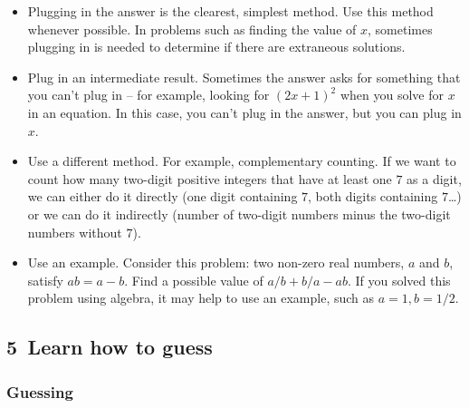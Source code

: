 \documentclass[10pt,paper=letter]{scrartcl}
\begin{document}
\begin{itemize}

\item Plugging in the answer is the clearest, simplest method. Use this method whenever possible. In problems such as finding the value of $x$, sometimes plugging in is needed to determine if there are extraneous solutions.

\item Plug in an intermediate result. Sometimes the answer asks for something that you can't plug in -- for example, looking for $(2x+1)^2$ when you solve for $x$ in an equation. In this case, you can't plug in the answer, but you can plug in $x$.

\item Use a different method. For example, complementary counting. If we want to count how many two-digit positive integers that have at least one $7$ as a digit, we can either do it directly (one digit containing $7$, both digits containing $7$\dots) or we can do it indirectly (number of two-digit numbers minus the two-digit numbers without $7$).

\item Use an example. Consider this problem: two non-zero real numbers, $a$ and $b$, satisfy $ab = a-b$. Find a possible value of $a/b + b/a - ab$. If you solved this problem using algebra, it may help to use an example, such as $a = 1, b = 1/2$.

\end{itemize}

\subsection*{5 \,Learn how to guess}

\subsubsection*{Guessing}
\end{document}
